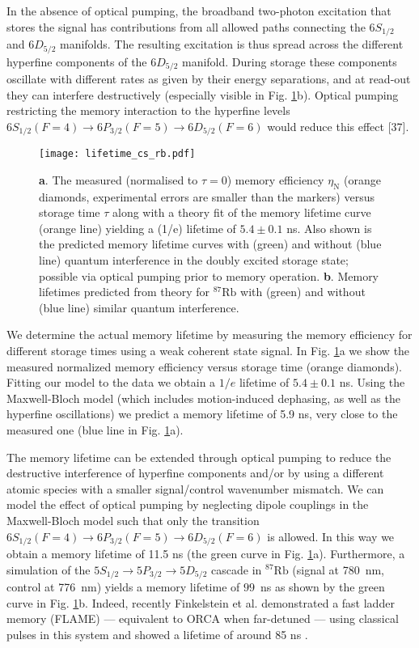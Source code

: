 \documentclass[%
 reprint,
 amsmath,amssymb,
 aps,
 pra,
]{revtex4-1}
\begin{document}
In the absence of optical pumping, the broadband two-photon excitation that stores the signal has contributions from all allowed paths connecting the $6S_{1/2}$ and $6D_{5/2}$ manifolds. The resulting excitation is thus spread across the different hyperfine components of the $6D_{5/2}$ manifold. During storage these components oscillate with different rates as given by their energy separations, and at read-out they can interfere destructively (especially visible in Fig. \ref{fig:figLifetime}b). Optical pumping restricting the memory interaction to the hyperfine levels $6S_{1/2}(F=4) \rightarrow 6P_{3/2}(F=5) \rightarrow 6D_{5/2}(F=6)$ would reduce this effect [37].

\begin{figure}[h]
\centering
\texttt{[image: lifetime\_cs\_rb.pdf]}
\caption{\textbf{a}. The measured (normalised to $\tau=0$) memory efficiency $\eta_\mathrm{N}$ (orange diamonds, experimental errors are smaller than the markers) versus storage time $\tau$ along with a theory fit of the memory lifetime curve (orange line) yielding a (1/e) lifetime of $5.4\pm0.1$ ns. Also shown is the predicted memory lifetime curves with (green) and without (blue line) quantum interference in the doubly excited storage state; possible via optical pumping prior to memory operation. \textbf{b}. Memory lifetimes predicted from theory for $^{87}\mathrm{Rb}$ with (green) and without (blue line) similar quantum interference.}
\label{fig:figLifetime}
\end{figure}

We determine the actual memory lifetime by measuring the memory efficiency for different storage times using a weak coherent state signal. In Fig. \ref{fig:figLifetime}a we show the measured normalized memory efficiency versus storage time (orange diamonds). Fitting our model to the data we obtain a $1/e$ lifetime of $5.4\pm 0.1$ ns. Using the Maxwell-Bloch model (which includes motion-induced dephasing, as well as the hyperfine oscillations) we predict a memory lifetime of 5.9 ns, very close to the measured one (blue line in Fig. \ref{fig:figLifetime}a).

The memory lifetime can be extended through optical pumping to reduce the destructive interference of hyperfine components and/or by using a different atomic species with a smaller signal/control wavenumber mismatch. We can model the effect of optical pumping by neglecting dipole couplings in the Maxwell-Bloch model such that only the transition $6S_{1/2}(F=4) \rightarrow 6P_{3/2}(F=5) \rightarrow 6D_{5/2}(F=6)$ is allowed. In this way we obtain a memory lifetime of 11.5 ns (the green curve in Fig. \ref{fig:figLifetime}a). Furthermore, a simulation of the $5S_{1/2}\rightarrow5P_{3/2}\rightarrow5D_{5/2}$ cascade in $^{87}\mathrm{Rb}$ (signal at 780~nm, control at 776~nm) yields a memory lifetime of $99$~ns as shown by the green curve in Fig. \ref{fig:figLifetime}b. Indeed, recently Finkelstein et al. demonstrated a fast ladder memory (FLAME) --- equivalent to ORCA when far-detuned --- using classical pulses in this system and showed a lifetime of around 85 ns \cite{Finkelstein2017}. 
\end{document}
